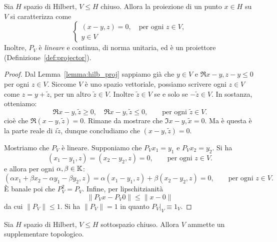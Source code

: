 \begin{theorem}
\label{th:hilb_projector_subspace}
	Sia $H$ spazio di Hilbert, $V \leq H$ chiuso.
	Allora la proiezione di un punto $x \in H$ su $V$ si caratterizza come
	\begin{equation*}
		\begin{cases}
			(x-y,z) = 0, \quad \text{per ogni $z \in V$},\\
			y \in V
		\end{cases}
	\end{equation*}
	Inoltre, $P_V$ è \emph{lineare} e continua, di norma unitaria, ed è un proiettore (Definizione~\ref{def:projector}).
\end{theorem}
\begin{proof}
	Dal Lemma~\ref{lemma:hilb_proj} sappiamo già che $y \in V$ e $\Re{x-y,z-y} \leq 0$ per ogni $z \in V$. Siccome $V$ è uno spazio vettoriale, possiamo scrivere ogni $z \in V$ come $z = y + \tilde z$, per un altro $\tilde z \in V$.
	Inoltre $\tilde z \in V$ se e solo se $-\tilde z \in V$. In sostanza, otteniamo:
	\begin{equation*}
		\Re{x-y, \tilde z} \geq 0, \quad \Re{x-y, \tilde z} \leq 0, \qquad \text{per ogni $\tilde z \in V$}.
	\end{equation*}
	cioè che $\Re(x-y,\tilde z) = 0$.
	Rimane da mostrare che $\Im{x-y,\tilde x} = 0$. Ma è questa è la parte reale di $i \tilde z$, dunque concludiamo che $(x-y, \tilde z) = 0$.

	Mostriamo che $P_V$ è lineare. Supponiamo che $P_Vx_1 = y_1$ e $P_V x_2 = y_2$. Si ha
	\begin{equation*}
		 (x_1-y_1, z) = (x_2-y_2, z) = 0, \qquad \text{per ogni $z \in V$}.
	\end{equation*}
	e allora per ogni $\alpha, \beta \in \mathbb{K}$:
	\begin{equation*}
		(\alpha x_1 + \beta x_2 - \alpha y_1 - \beta y_2, z) = \alpha (x_1 -y_1, z) + \beta (x_2-y_2, z) = 0, \qquad \text{per ogni $z \in V$}.
	\end{equation*}
	È banale poi che $P_V^2 =P_V$. Infine, per lipschitzianità
	\begin{equation*}
		\|P_V x - P_V 0 \| \leq \|x -0\|
	\end{equation*}
	da cui $\|P_V\| \leq 1$. Si ha $\|P_V\| = 1$ in quanto $P_V\vert_V \equiv 1_V$.
\end{proof}
\begin{corollary}
	Sia $H$ spazio di Hilbert, $V \leq H$ sottospazio chiuso.
	Allora $V$ ammette un supplementare topologico.
\end{corollary}

